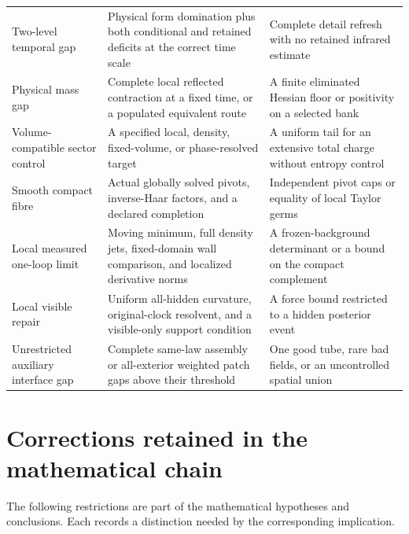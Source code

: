 \documentclass[11pt,oneside,openany]{book}
\theoremstyle{definition}
\theoremstyle{remark}
\begin{document}
\begin{longtable}{L{0.27\textwidth}L{0.34\textwidth}L{0.29\textwidth}}
Two-level temporal gap & Physical form domination plus both conditional and retained deficits at the correct time scale & Complete detail refresh with no retained infrared estimate \\
Physical mass gap & Complete local reflected contraction at a fixed time, or a populated equivalent route & A finite eliminated Hessian floor or positivity on a selected bank \\
Volume-compatible sector control & A specified local, density, fixed-volume, or phase-resolved target & A uniform tail for an extensive total charge without entropy control \\
Smooth compact fibre & Actual globally solved pivots, inverse-Haar factors, and a declared completion & Independent pivot caps or equality of local Taylor germs \\
Local measured one-loop limit & Moving minimum, full density jets, fixed-domain wall comparison, and localized derivative norms & A frozen-background determinant or a bound on the compact complement \\
Local visible repair & Uniform all-hidden curvature, original-clock resolvent, and a visible-only support condition & A force bound restricted to a hidden posterior event \\
Unrestricted auxiliary interface gap & Complete same-law assembly or all-exterior weighted patch gaps above their threshold & One good tube, rare bad fields, or an uncontrolled spatial union \\
\bottomrule
\end{longtable}

\chapter{Corrections retained in the mathematical chain}
\label{app:corrections}
The following restrictions are part of the mathematical hypotheses and conclusions. Each records a distinction needed by the corresponding implication.
\end{document}
